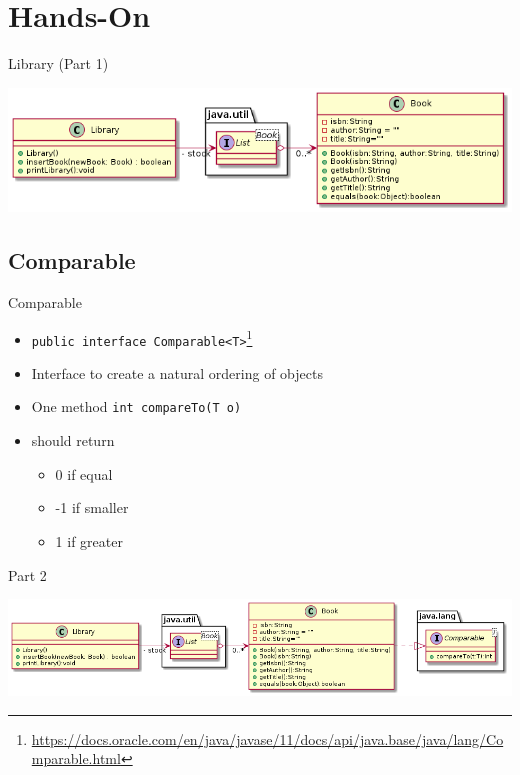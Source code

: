 \section{Hands-On}
\begin{frame}[fragile]{Library (Part 1)}
	
	\begin{center}
		\includegraphics[width=\textwidth]{07_collection/hands_on_01.png}
	\end{center}

	
\end{frame}
\subsection{Comparable}
\begin{frame}{Comparable}
	\begin{itemize}
		\item \texttt{public interface Comparable<T>}\footnote{\url{https://docs.oracle.com/en/java/javase/11/docs/api/java.base/java/lang/Comparable.html}}
		\item Interface to create a natural ordering of objects
		\item One method \texttt{int compareTo(T o)}
		\item should return
			\begin{itemize}
				\item 0 if equal
				\item -1 if smaller
				\item 1 if greater
			\end{itemize}
	\end{itemize}
	

	
\end{frame}
\begin{frame}{Part 2}

		\begin{center}
		\includegraphics[width=\textwidth]{07_collection/hands_on_02.png}
		\end{center}

\end{frame}
